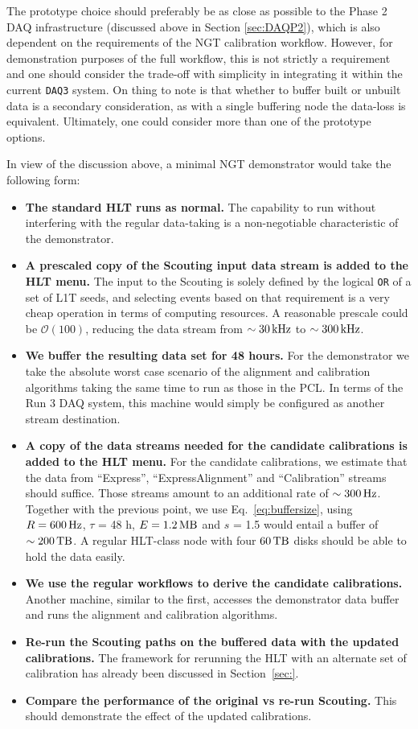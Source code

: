 The prototype choice should preferably be as close as possible to the Phase 2 DAQ infrastructure (discussed above in Section \ref{sec:DAQP2}), which is also dependent on the requirements of the NGT calibration workflow. However, for demonstration purposes of the full workflow, this is not strictly a requirement and one should consider the trade-off with simplicity in integrating it within the current \texttt{DAQ3} system. On thing to note is that whether to buffer built or unbuilt data is a secondary consideration, as with a single buffering node the data-loss is equivalent. Ultimately, one could consider more than one of the prototype options.

In view of the discussion above, a minimal NGT demonstrator would take the following form:
\begin{itemize}
\item \textbf{The standard HLT runs as normal.} 
The capability to run without interfering with the regular data-taking is
a non-negotiable characteristic of the demonstrator.
\item \textbf{A prescaled copy of the Scouting input data stream is added to the HLT menu.}
The input to the Scouting is solely defined by the logical \texttt{OR} of a set of L1T seeds, and
selecting events based on that requirement is a very cheap operation in terms of computing resources.
A reasonable prescale could be $\mathcal{O}(100)$, reducing the data stream 
from $\sim 30\,\text{kHz}$
to $\sim 300\,\text{kHz}$.
\item \textbf{We buffer the resulting data set for 48 hours.}
For the demonstrator we take the absolute worst case scenario of the alignment and calibration algorithms taking the same time to run as those in the PCL.
In terms of the Run 3 DAQ system, this machine would simply be configured as another stream destination.
\item \textbf{A copy of the data streams needed for the candidate calibrations is added to the HLT menu.}
For the candidate calibrations, we estimate that 
the data from ``Express'', ``ExpressAlignment'' and ``Calibration'' streams should suffice.
Those streams amount to an additional rate of $\sim 300\,\text{Hz}$.
Together with the previous point, we
use Eq.~\ref{eq:buffersize}, using 
$R = 600\,\text{Hz}$,
$\tau$ = 48 h,
$E = 1.2\,\text{MB}$ and
$s$ = 1.5
would entail a buffer of $\sim 200\,\text{TB}$.
A regular HLT-class node with four $60\,\text{TB}$ disks should be able to hold the data easily.
\item \textbf{We use the regular workflows to derive the candidate calibrations.}
Another machine, similar to the first, accesses the demonstrator data buffer
and
runs the alignment and calibration algorithms.
\item \textbf{Re-run the Scouting paths on the buffered data with the updated calibrations.}
The framework for rerunning the HLT with an alternate set of calibration has already been discussed in Section~\ref{sec:}.
\item \textbf{Compare the performance of the original vs re-run Scouting.}
This should demonstrate the effect of the updated calibrations. 
\end{itemize}